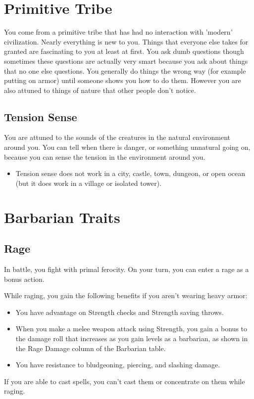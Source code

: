 {\section*{Primitive Tribe}
You come from a primitive tribe that has had no interaction with 'modern' civilization. Nearly everything is new to you. Things that everyone else takes for granted are fascinating to you at least at first. You ask dumb questions though sometimes these questions are actually very smart because you ask about things that no one else questions. You generally do things the wrong way (for example putting on armor) until someone shows you how to do them. However you are also attuned to things of nature that other people don't notice.
\subsection*{Tension Sense}
You are attuned to the sounds of the creatures in the natural environment around you. You can tell when there is danger, or something unnatural going on, because you can sense the tension in the environment around you.
\begin{itemize}
	\item Tension sense does not work in a city, castle, town, dungeon, or open ocean (but it does work in a village or isolated tower).
\end{itemize}

\section*{Barbarian Traits}
\subsection*{Rage}
In battle, you fight with primal ferocity. On your turn, you can enter a rage as a bonus action.

While raging, you gain the following benefits if you aren't wearing heavy armor:

\begin{itemize}
	\item You have advantage on Strength checks and Strength saving throws.
	\item When you make a melee weapon attack using Strength, you gain a bonus to the damage roll that increases as you gain levels as a barbarian, as shown in the Rage Damage column of the Barbarian table.
	\item You have resistance to bludgeoning, piercing, and slashing damage.
\end{itemize}
If you are able to cast spells, you can't cast them or concentrate on them while raging.

}
